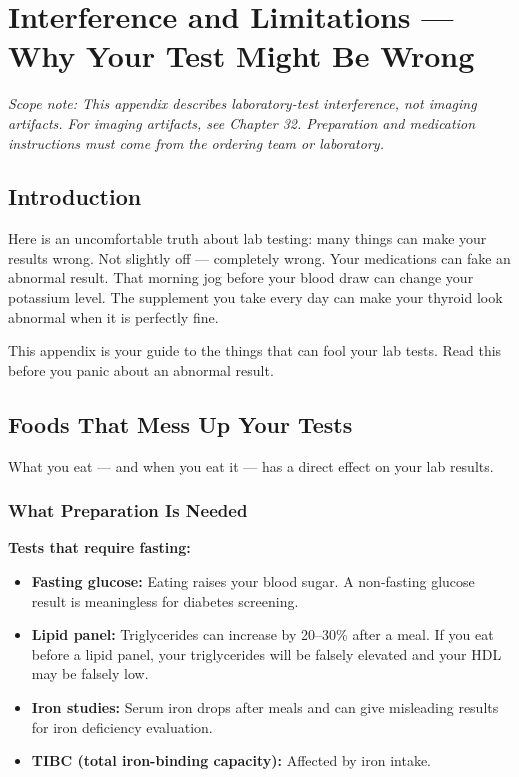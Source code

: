 \chapter{Interference and Limitations --- Why Your Test Might Be Wrong}
\label{app:interference}

\textit{Scope note: This appendix describes laboratory-test interference, not imaging artifacts. For imaging artifacts, see Chapter 32. Preparation and medication instructions must come from the ordering team or laboratory.}

\clearpage
\section{Introduction}

Here is an uncomfortable truth about lab testing: many things can make your results wrong. Not slightly off --- completely wrong. Your medications can fake an abnormal result. That morning jog before your blood draw can change your potassium level. The supplement you take every day can make your thyroid look abnormal when it is perfectly fine.

This appendix is your guide to the things that can fool your lab tests. Read this before you panic about an abnormal result.

\clearpage
\section{Foods That Mess Up Your Tests}

What you eat --- and when you eat it --- has a direct effect on your lab results.

\subsection{What Preparation Is Needed}

\textbf{Tests that require fasting:}
\begin{itemize}
    \item \textbf{Fasting glucose:} Eating raises your blood sugar. A non-fasting glucose result is meaningless for diabetes screening.
    \item \textbf{Lipid panel:} Triglycerides can increase by 20--30\% after a meal. If you eat before a lipid panel, your triglycerides will be falsely elevated and your HDL may be falsely low.
    \item \textbf{Iron studies:} Serum iron drops after meals and can give misleading results for iron deficiency evaluation.
    \item \textbf{TIBC (total iron-binding capacity):} Affected by iron intake.
\end{itemize}

